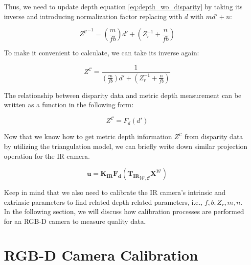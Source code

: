 \documentclass[a4paper]{report}
\numberwithin{figure}{section}
\begin{document}
Thus, we need to update depth equation \eqref{eq:depth_wo_disparity} by taking 
its inverse and introducing normalization factor replacing with $d$ with 
$md'+n$:

\begin{equation}\label{eq:depth_w_disparity_reverse}
  {Z^{\mathcal{C}}}^{-1} = (\frac{m}{fb})d' + (Z_r^{-1} + \frac{n}{fb})
\end{equation}

To make it convenient to calculate, we can take its inverse again:

\begin{equation}\label{eq:depth_w_disparity}
  Z^{\mathcal{C}} = \frac{1}{(\frac{m}{fb})d' + (Z_r^{-1} + \frac{n}{fb})}
\end{equation}

The relationship between disparity data and metric depth measurement can be 
written as a function in the following form:

\begin{equation}\label{eq:ir_cam_proj_func}
  Z^{\mathcal{C}}
  =
  F_d(d')
\end{equation} 


Now that we know how to get metric depth information $Z^{\mathcal{C}}$ from 
disparity data 
by utilizing the triangulation model, we can briefly write down similar 
projection operation for the IR camera.

\begin{equation}\label{eq:ir_cam_proj_func}
  \mathbf{u} 
  =
  \mathbf{K_{IR}} \mathbf{F_d} ({\mathbf{T_{IR}}}_{\mathcal{W}, \mathcal{C}}  
  \mathbf{X^{\mathcal{W}}})
\end{equation} 


Keep in mind that we also need to calibrate the IR camera's intrinsic and 
extrinsic parameters to find related depth related parameters, i.e., 
$f,b,Z_r,m, n$. In the following section, we will discuss how calibration 
processes are performed for an RGB-D camera to measure quality data.

\section{RGB-D Camera Calibration} \label{sb_sc_rgb_calibration}
\end{document}
